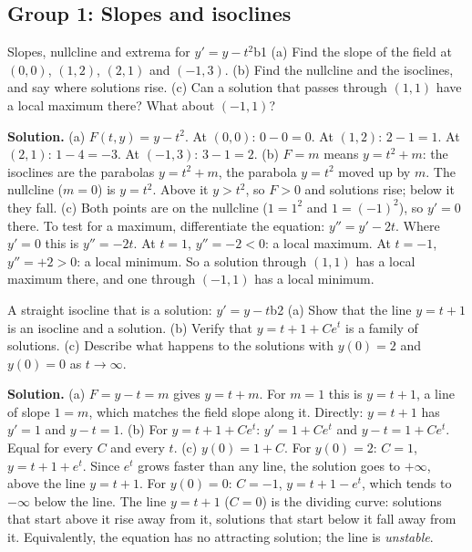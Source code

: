 \documentclass[11pt]{article}
\begin{document}
\subsection*{Group 1: Slopes and isoclines}

\begin{exmp}{Slopes, nullcline and extrema for $y'=y-t^2$}{b1}
(a) Find the slope of the field at $(0,0)$, $(1,2)$, $(2,1)$ and $(-1,3)$. (b) Find the nullcline and the isoclines, and say where solutions rise. (c) Can a solution that passes through $(1,1)$ have a local maximum there? What about $(-1,1)$?

\textbf{Solution.} (a) $F(t,y)=y-t^2$. At $(0,0)$: $0-0=0$. At $(1,2)$: $2-1=1$. At $(2,1)$: $1-4=-3$. At $(-1,3)$: $3-1=2$.
(b) $F=m$ means $y=t^2+m$: the isoclines are the parabolas $y=t^2+m$, the parabola $y=t^2$ moved up by $m$. The nullcline ($m=0$) is $y=t^2$. Above it $y>t^2$, so $F>0$ and solutions rise; below it they fall.
(c) Both points are on the nullcline ($1=1^2$ and $1=(-1)^2$), so $y'=0$ there. To test for a maximum, differentiate the equation: $y''=y'-2t$. Where $y'=0$ this is $y''=-2t$. At $t=1$, $y''=-2<0$: a local maximum. At $t=-1$, $y''=+2>0$: a local minimum. So a solution through $(1,1)$ has a local maximum there, and one through $(-1,1)$ has a local minimum.
\end{exmp}

\begin{exmp}{A straight isocline that is a solution: $y'=y-t$}{b2}
(a) Show that the line $y=t+1$ is an isocline and a solution. (b) Verify that $y=t+1+Ce^t$ is a family of solutions. (c) Describe what happens to the solutions with $y(0)=2$ and $y(0)=0$ as $t\to\infty$.

\textbf{Solution.} (a) $F=y-t=m$ gives $y=t+m$. For $m=1$ this is $y=t+1$, a line of slope $1=m$, which matches the field slope along it. Directly: $y=t+1$ has $y'=1$ and $y-t=1$.
(b) For $y=t+1+Ce^t$: $y'=1+Ce^t$ and $y-t=1+Ce^t$. Equal for every $C$ and every $t$.
(c) $y(0)=1+C$. For $y(0)=2$: $C=1$, $y=t+1+e^t$. Since $e^t$ grows faster than any line, the solution goes to $+\infty$, above the line $y=t+1$. For $y(0)=0$: $C=-1$, $y=t+1-e^t$, which tends to $-\infty$ below the line. The line $y=t+1$ ($C=0$) is the dividing curve: solutions that start above it rise away from it, solutions that start below it fall away from it. Equivalently, the equation has no attracting solution; the line is \emph{unstable}.
\end{exmp}
\end{document}
